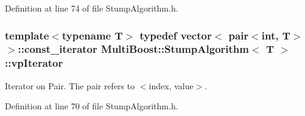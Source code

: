 Definition at line 74 of file Stump\-Algorithm.\-h.

\hypertarget{classMultiBoost_1_1StumpAlgorithm_a358eae7c8636c09b6b26ef0cc74bbd51}{
\subsubsection[{vp\-Iterator}]{\setlength{\rightskip}{0pt plus 5cm}template$<$typename T$>$ typedef vector$<$ pair$<$int, T$>$ $>$\-::const\-\_\-iterator {\bf Multi\-Boost\-::\-Stump\-Algorithm}$<$ T $>$\-::{\bf vp\-Iterator}}}\label{classMultiBoost_1_1StumpAlgorithm_a358eae7c8636c09b6b26ef0cc74bbd51}
Iterator on Pair. The pair refers to $<$index, value$>$. 

Definition at line 70 of file Stump\-Algorithm.\-h.



